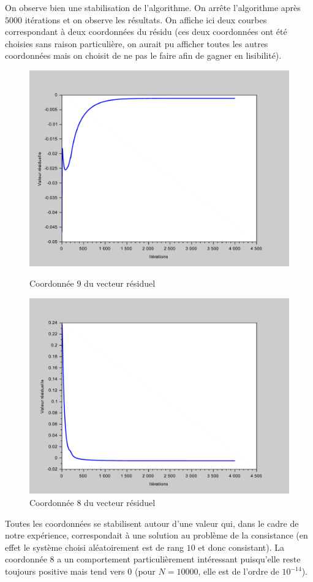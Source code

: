 \documentclass[10pt,a4paper]{article}
\begin{document}
On observe bien une stabilisation de l'algorithme.
On arrête l'algorithme après $5000$ itérations et on observe les résultats. On affiche ici deux courbes correspondant à deux coordonnées du résidu (ces deux coordonnées ont été choisies sans raison particulière, on aurait pu afficher toutes les autres coordonnées mais on choisit de ne pas le faire afin de gagner en lisibilité).

\begin{figure}[H]
\centering
\begin{minipage}{.47\linewidth}
\centering
\includegraphics[scale=0.4]{gradprojres_9.pdf}
\caption{Coordonnée $9$ du vecteur résiduel}
\end{minipage}
\begin{minipage}{.47\linewidth}
\centering
\includegraphics[scale=0.4]{gradprojres_8.pdf}
\caption{Coordonnée $8$ du vecteur résiduel}
\end{minipage}
\end{figure}

Toutes les coordonnées se stabilisent autour d'une valeur qui, dans le cadre de notre expérience, correspondait à une solution au problème de la consistance (en effet le système choisi aléatoirement est de rang $10$ et donc consistant). La coordonnée $8$ a un comportement particulièrement intéressant puisqu'elle reste toujours positive mais tend vers $0$ (pour $N = 10000$, elle est de l'ordre de $10^{-14}$).


\end{document}
